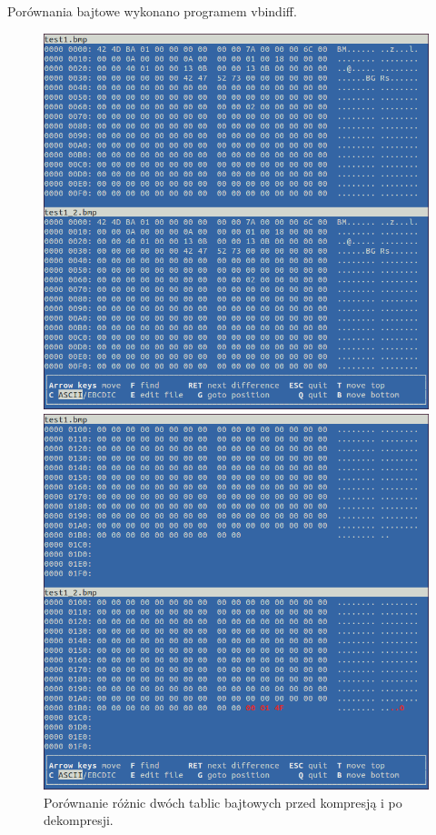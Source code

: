 \documentclass[12pt,a4paper,notitlepage]{report}
\begin{document}
Porównania bajtowe wykonano programem vbindiff\cite{diff}.
\begin{figure}[H]
	\caption{Porównanie różnic dwóch tablic bajtowych przed kompresją i po dekompresji.}
	\centering
	\begin{minipage}{0.45\textwidth}
		\centering
		\includegraphics[scale=.3]{test1_beg}
	\end{minipage}\hfill
	\begin{minipage}{0.45\textwidth}
		\centering
		\includegraphics[scale=.3]{test1_end}
	\end{minipage}
\end{figure}
\end{document}
